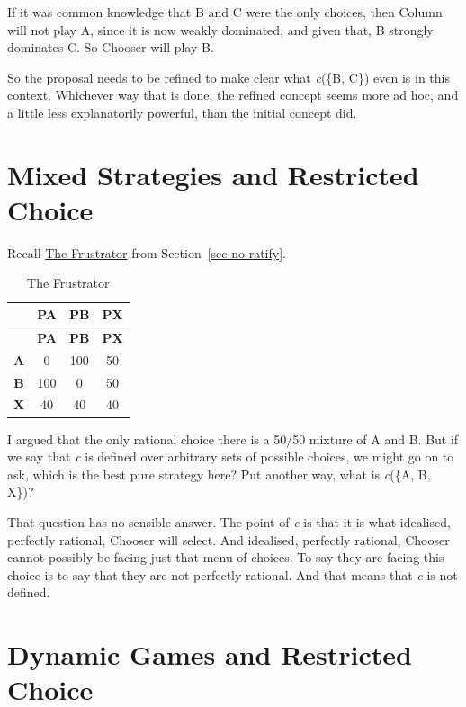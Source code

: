 \documentclass[
  12pt,
  letterpaper,
  DIV=11,
  numbers=noendperiod]{scrreprt}
\begin{document}
If it was common knowledge that B and C were the only choices, then
Column will not play A, since it is now weakly dominated, and given
that, B strongly dominates C. So Chooser will play B.

So the proposal needs to be refined to make clear what \emph{c}(\{B,
C\}) even is in this context. Whichever way that is done, the refined
concept seems more ad hoc, and a little less explanatorily powerful,
than the initial concept did.

\section{Mixed Strategies and Restricted
Choice}\label{sec-mixed-restricted}

Recall \hyperref[tbl-frustrator]{The Frustrator} from
Section~\ref{sec-no-ratify}.

\begin{longtable}[]{@{}cccc@{}}
\caption{The Frustrator}\label{tbl-frustrator}\tabularnewline
\toprule\noalign{}
& \textbf{PA} & \textbf{PB} & \textbf{PX} \\
\midrule\noalign{}
\endfirsthead
\toprule\noalign{}
& \textbf{PA} & \textbf{PB} & \textbf{PX} \\
\midrule\noalign{}
\endhead
\bottomrule\noalign{}
\endlastfoot
\textbf{A} & 0 & 100 & 50 \\
\textbf{B} & 100 & 0 & 50 \\
\textbf{X} & 40 & 40 & 40 \\
\end{longtable}

I argued that the only rational choice there is a 50/50 mixture of A and
B. But if we say that \emph{c} is defined over arbitrary sets of
possible choices, we might go on to ask, which is the best pure strategy
here? Put another way, what is \emph{c}(\{A, B, X\})?

That question has no sensible answer. The point of \emph{c} is that it
is what idealised, perfectly rational, Chooser will select. And
idealised, perfectly rational, Chooser cannot possibly be facing just
that menu of choices. To say they are facing this choice is to say that
they are not perfectly rational. And that means that \emph{c} is not
defined.

\section{Dynamic Games and Restricted
Choice}\label{sec-dynamic-restricted}
\end{document}
